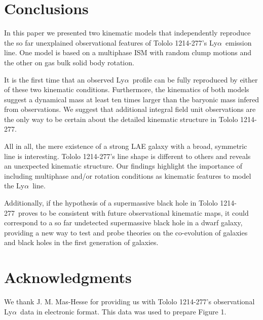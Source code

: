 \documentclass[a4,useAMS,usenatbib,usegraphicx]{mn2e}
\newcommand{\tol}{Tololo 1214-277}
\newcommand{\lya}{Ly$\alpha$}
\begin{document}
\section{Conclusions}

In this paper we presented two kinematic models that independently
reproduce the so far unexplained observational features of \tol's
\lya\ emission line.  One model is based on a multiphase ISM with random clump motions and
the other on gas bulk solid body rotation.

It is the first time that an observed \lya\ profile can be fully
reproduced by either of these two kinematic conditions.
Furthermore, the kinematics of both models suggest a dynamical mass
at least ten times larger than the baryonic mass infered from observations.
We suggest that additional integral field unit observations are the
only way to be certain about the detailed kinematic structure in \tol.

All in all, the mere existence of a strong LAE galaxy with a broad,
symmetric line is interesting. 
\tol's line shape is different to others and reveals an unexpected
kinematic structure.
Our findings highlight the importance of including multiphase and/or
rotation conditions as kinematic features to model the \lya\ line.

Additionally, if the hypothesis of a supermassive black
hole in \tol\ proves to be consistent with future observational
kinematic maps, it could correspond to a so far undetected
supermassive black hole in a dwarf galaxy, providing a new way to test
and probe theories on the co-evolution of galaxies and black holes in
the first generation of galaxies.   

\section*{Acknowledgments}
We thank J. M. Mas-Hesse for providing us with \tol's observational
\lya\ data \citep{mashesse03} in electronic format. This data was
used to prepare Figure 1.





\end{document}
